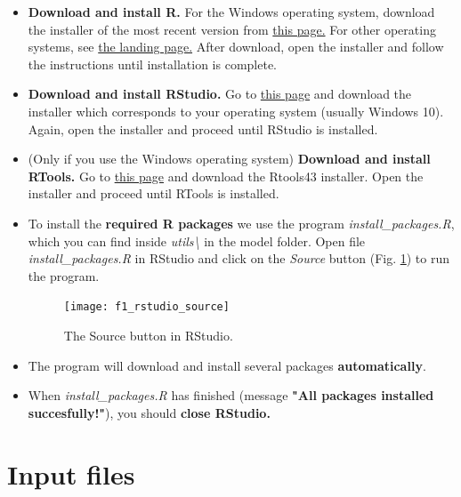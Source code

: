\documentclass[15pt]{extarticle}
\begin{document}
\begin{itemize}
    \item \textbf{Download and install R.} For the Windows operating system, download the installer of the most recent version from \href{https://cran.rstudio.com/bin/windows/base/}{this page.} For other operating systems, see \href{https://cran.rstudio.com/}{the landing page.} After download, open the installer and follow the instructions until installation is complete.
    \item \textbf{Download and install RStudio.} Go to \href{https://www.rstudio.com/products/rstudio/download/#download}{this page} and download the installer which corresponds to your operating system (usually Windows 10). Again, open the installer and proceed until RStudio is installed.
    \item (Only if you use the Windows operating system) \textbf{Download and install RTools.} Go to \href{https://cran.r-project.org/bin/windows/Rtools/rtools43/rtools.html}{this page} and download the Rtools43 installer. Open the installer and proceed until RTools is installed.
    \item To install the \textbf{required R packages} we use the program \textit{install\_packages.R}, which you can find inside \textit{utils\textbackslash} in the model folder. Open file \textit{install\_packages.R} in RStudio and click on the \textit{Source} button (Fig. \ref{fig:f1_rstudio_source}) to run the program.

\begin{figure}[h]
    \centering
    \texttt{[image: f1\_rstudio\_source]}
    \caption{The Source button in RStudio.}
    \label{fig:f1_rstudio_source}
\end{figure}

    \item The program will download and install several packages \textbf{automatically}.
    \item When \textit{install\_packages.R} has finished (message \textbf{"All packages installed succesfully!"}), you should \textbf{close RStudio.}
\end{itemize}


\clearpage
\section{Input files}
\end{document}
